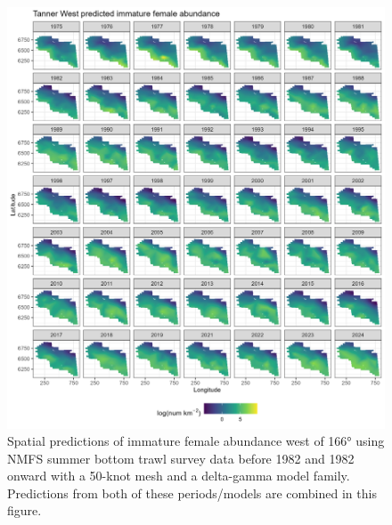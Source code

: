\documentclass[
]{article}
\begin{document}
\begin{figure}

{\centering \includegraphics[width=1\linewidth,height=1\textheight]{../BAIRDI/Figures/TannerW_imfem_spatabund} 

}

\caption{Spatial predictions of immature female abundance west of 166° using NMFS summer bottom trawl survey data before 1982 and 1982 onward with a 50-knot mesh and a delta-gamma model family. Predictions from both of these periods/models are combined in this figure.}\label{fig:spatpred-abund-50-imfemW}
\end{figure}
\end{document}
